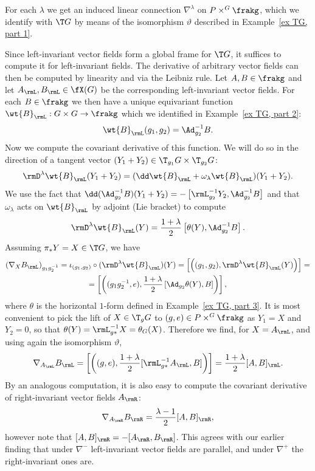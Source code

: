 \begin{example}\label{ex connections on G, part 3}
    For each $\lambda$ we get an induced linear connection $\nabla^\lambda$ on $P\times^G \frakg$, which we identify with $\T G$ by means of the isomorphism $\vartheta$ described in Example~\ref{ex TG, part 1}. 

    Since left-invariant vector fields form a global frame for $\T G$, it suffices to compute it for left-invariant fields. The derivative of arbitrary vector fields can then be computed by linearity and via the Leibniz rule. Let $A,B\in\frakg$ and let $A_\rmL,B_\rmL\in\fX(G)$ be the corresponding left-invariant vector fields. 
    For each $B\in\frakg$ we then have a unique equivariant function $\wt{B}_\rmL:G\times G\to \frakg$ which we identified in Example~\ref{ex TG, part 2}:
    \[
        \wt{B}_\rmL(g_1,g_2)=\Ad_{g_2}^{-1}B.
    \]
    Now we compute the covariant derivative of this function. We will do so in the direction of a tangent vector $(Y_1+Y_2)\in \T_{g_1}G\times \T_{g_2}G$:
    \[\rmD^\lambda \wt{B}_\rmL(Y_1+Y_2)=(\dd\wt{B}_\rmL+\omega_\lambda \wt{B}_\rmL)(Y_1+Y_2).\]
    We use the fact that $\dd (\Ad_{g_2}^{-1} B)(Y_1+Y_2)=-\left[ \rmL_{g_2}^{-1}Y_2,\Ad_{g_2}^{-1}B\right]$ and that $\omega_\lambda$ acts on $\wt{B}_\rmL$ by adjoint (Lie bracket) to compute
    \[\rmD^\lambda \wt{B}_\rmL(Y)=\frac{1+\lambda}{2}\left[\theta(Y),\Ad_{g_2}^{-1}B\right].\]
    Assuming $\pi_\ast Y=X\in \T G$, we have
    \begin{multline}
        \left( \nabla_X B_\rmL \right)_{g_1g_2^{-1}}=\iota_{(g_1,g_2)}\circ (\rmD^\lambda \wt{B}_\rmL)(Y)=\left[\left( (g_1,g_2),\rmD^\lambda \wt{B}_\rmL(Y) \right)\right]=\\=\left[\left( (g_1g_2^{-1},e),\frac{1+\lambda}{2}\left[\Ad_{g_2}\theta(Y),B\right]\right)\right],
    \end{multline}
    where $\theta$ is the horizontal $1$-form defined in Example~\ref{ex TG, part 3}.
    It is most convenient to pick the lift of $X\in \T_g G$ to $(g,e)\in P\times^G \frakg$ as $Y_1=X$ and $Y_2=0$, so that $\theta(Y)=\rmL_{g\ast}^{-1}X=\theta_G(X)$. Therefore we find, for $X=A_\rmL$, and using again the isomorphism $\vartheta$,
    \[\nabla_{A_\rmL}B_\rmL=\left[\left( (g,e),\frac{1+\lambda}{2}[\rmL_{g\ast}^{-1}A_\rmL,B] \right)\right]=\frac{1+\lambda}{2}[A,B]_\rmL.\]
    By an analogous computation, it is also easy to compute the covariant derivative of right-invariant vector fields $A_\rmR$:
    \[\nabla_{A_\rmR}B_\rmR=\frac{\lambda-1}{2}[A,B]_\rmR,\]
    however note that $[A,B]_\rmR=-[A_\rmR,B_\rmR]$. This agrees with our earlier finding that under $\nabla^-$ left-invariant vector fields are parallel, and under $\nabla^+$ the right-invariant ones are.  
    

\end{example}
